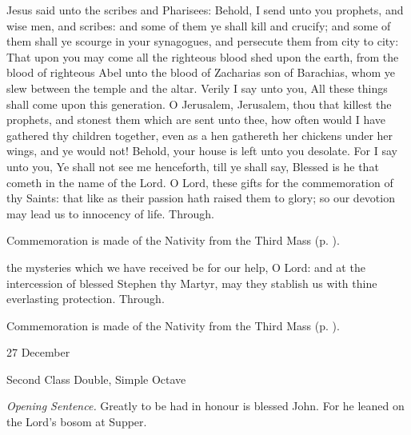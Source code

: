  Jesus said unto the scribes and Pharisees: Behold, I send unto you prophets, and wise men, and scribes: and some of them ye shall kill and crucify; and some of them shall ye scourge in your synagogues, and persecute them from city to city: That upon you may come all the righteous blood shed upon the earth, from the blood of righteous Abel unto the blood of Zacharias son of Barachias, whom ye slew between the temple and the altar. Verily I say unto you, All these things shall come upon this generation. O Jerusalem, Jerusalem, thou that killest the prophets, and stonest them which are sent unto thee, how often would I have gathered thy children together, even as a hen gathereth her chickens under her wings, and ye would not! Behold, your house is left unto you desolate. For I say unto you, Ye shall not see me henceforth, till ye shall say, Blessed is he that cometh in the name of the Lord.
\secret
{} O Lord, these gifts for the commemoration of thy Saints: that like as their passion hath raised them to glory; so our devotion may lead us to innocency of life. Through.
\begin{rubric}
    Commemoration is made of the Nativity from the Third Mass (p. \pageref{NativityMassIIISecret}).
\end{rubric}
\postcommunion
{} the mysteries which we have received be for our help, O Lord: and at the intercession of blessed Stephen thy Martyr, may they stablish us with thine everlasting protection. Through.
\begin{rubric}
    Commemoration is made of the Nativity from the Third Mass (p. \pageref{NativityMassIIIPostcommunion}).
\end{rubric}


\begin{inhead}
{27 December}\par
{Second Class Double, Simple Octave}
\end{inhead}
\par\noindent
\textit{Opening Sentence.} Greatly to be had in honour is blessed John. For he leaned on the Lord's bosom at Supper.

